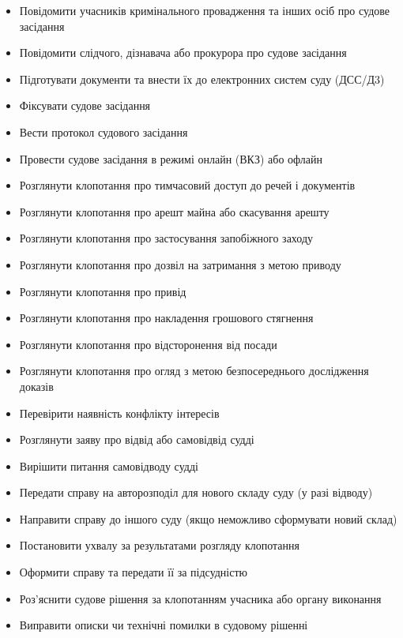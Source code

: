 \documentclass{article}
\begin{document}
\begin{itemize}
    \item Повідомити учасників кримінального провадження та інших осіб про судове засідання
    \item Повідомити слідчого, дізнавача або прокурора про судове засідання
    \item Підготувати документи та внести їх до електронних систем суду (ДСС/Д3)
    \item Фіксувати судове засідання
    \item Вести протокол судового засідання
    \item Провести судове засідання в режимі онлайн (ВКЗ) або офлайн
    \item Розглянути клопотання про тимчасовий доступ до речей і документів
    \item Розглянути клопотання про арешт майна або скасування арешту
    \item Розглянути клопотання про застосування запобіжного заходу
    \item Розглянути клопотання про дозвіл на затримання з метою приводу
    \item Розглянути клопотання про привід
    \item Розглянути клопотання про накладення грошового стягнення
    \item Розглянути клопотання про відсторонення від посади
    \item Розглянути клопотання про огляд з метою безпосереднього дослідження доказів
    \item Перевірити наявність конфлікту інтересів
    \item Розглянути заяву про відвід або самовідвід судді
    \item Вирішити питання самовідводу судді
    \item Передати справу на авторозподіл для нового складу суду (у разі відводу)
    \item Направити справу до іншого суду (якщо неможливо сформувати новий склад)
    \item Постановити ухвалу за результатами розгляду клопотання
    \item Оформити справу та передати її за підсудністю
    \item Роз’яснити судове рішення за клопотанням учасника або органу виконання
    \item Виправити описки чи технічні помилки в судовому рішенні
\end{itemize}
\end{document}
